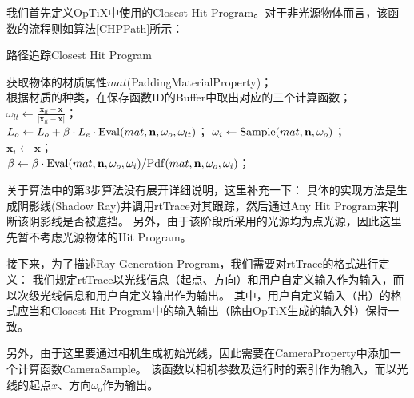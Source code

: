 我们首先定义OpTiX中使用的Closest Hit Program。对于非光源物体而言，该函数的流程则如算法\ref{CHPPath}所示：
\begin{algorithm}
    \caption{路径追踪Closest Hit Program}
    \label{CHPPath}

    获取物体的材质属性$mat$(PaddingMaterialProperty)；\\
    根据材质的种类，在保存函数ID的Buffer中取出对应的三个计算函数；\\
    {
        $\omega_{lt} \leftarrow \frac{\textbf{x}_{lt}-\textbf{x}}{|\textbf{x}_{lt}-\textbf{x}|}$；\\
        $L_o \leftarrow L_o+\beta\cdot L_e\cdot {\rm Eval}(mat, \textbf{n}, \omega_o, \omega_{lt}) $；
    }
    $\omega_i \leftarrow {\rm Sample}(mat, \textbf{n}, \omega_o)$；\\
    $\textbf{x}_i \leftarrow \textbf{x}$；\\
    $\beta \leftarrow \beta\cdot {\rm Eval}(mat, \textbf{n}, \omega_o, \omega_i)/ {\rm Pdf}(mat, \textbf{n}, \omega_o, \omega_i)$；\\
\end{algorithm}

关于算法中的第3步算法没有展开详细说明，这里补充一下：
具体的实现方法是生成阴影线(Shadow Ray)并调用rtTrace对其跟踪，然后通过Any Hit Program来判断该阴影线是否被遮挡。
另外，由于该阶段所采用的光源均为点光源，因此这里先暂不考虑光源物体的Hit Program。

接下来，为了描述Ray Generation Program，我们需要对rtTrace的格式进行定义：
我们规定rtTrace以光线信息（起点、方向）和用户自定义输入作为输入，而以次级光线信息和用户自定义输出作为输出。
其中，用户自定义输入（出）的格式应当和Closest Hit Program中的输入输出（除由OpTiX生成的输入外）保持一致。

另外，由于这里要通过相机生成初始光线，因此需要在CameraProperty中添加一个计算函数CameraSample。
该函数以相机参数及运行时的索引作为输入，而以光线的起点$x$、方向$\omega_o$作为输出。

